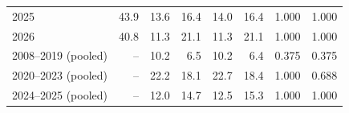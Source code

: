 \begin{table}[H]
\begin{tabular}{@{}lrrrrrrr@{}}
2025 & 43.9 & 13.6 & 16.4 & 14.0 & 16.4 & 1.000 & 1.000 \\
2026 & 40.8 & 11.3 & 21.1 & 11.3 & 21.1 & 1.000 & 1.000 \\
\midrule
2008--2019 (pooled) & -- & 10.2 & 6.5 & 10.2 & 6.4 & 0.375 & 0.375 \\
2020--2023 (pooled) & -- & 22.2 & 18.1 & 22.7 & 18.4 & 1.000 & 0.688 \\
2024--2025 (pooled) & -- & 12.0 & 14.7 & 12.5 & 15.3 & 1.000 & 1.000 \\
\bottomrule
\end{tabular}
\end{table}

